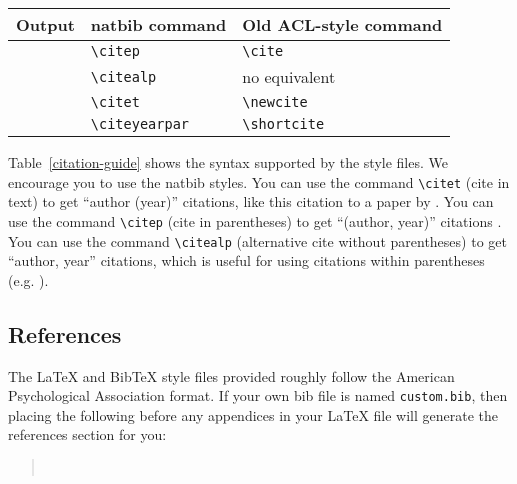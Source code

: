 \documentclass[11pt]{article}
\begin{document}
\begin{table*}
\centering
\begin{tabular}{lll}
\hline
\textbf{Output} & \textbf{natbib command} & \textbf{Old ACL-style command}\\
\hline
\citep{Gusfield:97} & \verb|\citep| & \verb|\cite| \\
\citealp{Gusfield:97} & \verb|\citealp| & no equivalent \\
\citet{Gusfield:97} & \verb|\citet| & \verb|\newcite| \\
\citeyearpar{Gusfield:97} & \verb|\citeyearpar| & \verb|\shortcite| \\
\hline
\end{tabular}
\caption{\label{citation-guide}
Citation commands supported by the style file.
The style is based on the natbib package and supports all natbib citation commands.
It also supports commands defined in previous ACL style files for compatibility.
}
\end{table*}

Table~\ref{citation-guide} shows the syntax supported by the style files.
We encourage you to use the natbib styles.
You can use the command \verb|\citet| (cite in text) to get ``author (year)'' citations, like this citation to a paper by \citet{Gusfield:97}.
You can use the command \verb|\citep| (cite in parentheses) to get ``(author, year)'' citations \citep{Gusfield:97}.
You can use the command \verb|\citealp| (alternative cite without parentheses) to get ``author, year'' citations, which is useful for using citations within parentheses (e.g. \citealp{Gusfield:97}).

\subsection{References}

\nocite{Ando2005,borschinger-johnson-2011-particle,andrew2007scalable,rasooli-tetrault-2015,goodman-etal-2016-noise,harper-2014-learning}

The \LaTeX{} and Bib\TeX{} style files provided roughly follow the American Psychological Association format.
If your own bib file is named \texttt{custom.bib}, then placing the following before any appendices in your \LaTeX{} file will generate the references section for you:
\begin{quote}
\begin{verbatim}


\end{verbatim}
\end{quote}
\end{document}
